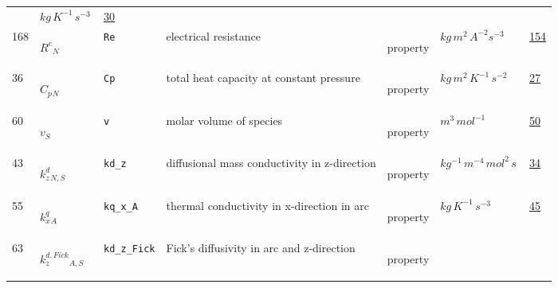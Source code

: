 \begin{longtable}{|p{1cm}|p{2.5cm}|p{4.5cm}|p{8cm}|p{3.0cm}|p{3cm}|p{1cm}|}
             & $ kg \,K^{-1} \,s^{-3} \, $
             &                 \hyperlink{"e:30"}{ 30 }
                 \\
            168
             & \hypertarget{"v:168"}{ $ {{R^e}}{_{N}} $}
             & \verb|Re|
             & electrical resistance
             & \begin{lay}property \end{lay}
             & $ kg \,m^{2} \,A^{-2} s^{-3} \, $
             &                 \hyperlink{"e:154"}{ 154 }
                 \\
            36
             & \hypertarget{"v:36"}{ $ {{C_p}}{_{N}} $}
             & \verb|Cp|
             & total heat capacity at constant pressure
             & \begin{lay}property \end{lay}
             & $ kg \,m^{2} \,K^{-1} \,s^{-2} \, $
             &                 \hyperlink{"e:27"}{ 27 }
                 \\
            60
             & \hypertarget{"v:60"}{ $ {v}{_{S}} $}
             & \verb|v|
             & molar volume of species
             & \begin{lay}property \end{lay}
             & $ m^{3} \,mol^{-1} \, $
             &                 \hyperlink{"e:50"}{ 50 }
                 \\
            43
             & \hypertarget{"v:43"}{ $ {{k^d_z}}{_{N, S}} $}
             & \verb|kd_z|
             & diffusional mass conductivity in z-direction
             & \begin{lay}property \end{lay}
             & $ kg^{-1} \,m^{-4} \,mol^{2} \,s \, $
             &                 \hyperlink{"e:34"}{ 34 }
                 \\
            55
             & \hypertarget{"v:55"}{ $ {{k^q_x}}{_{A}} $}
             & \verb|kq_x_A|
             & thermal conductivity in x-direction in arc
             & \begin{lay}property \end{lay}
             & $ kg \,K^{-1} \,s^{-3} \, $
             &                 \hyperlink{"e:45"}{ 45 }
                 \\
            63
             & \hypertarget{"v:63"}{ $ {{k^{d,Fick}_z}}{_{A, S}} $}
             & \verb|kd_z_Fick|
             & Fick's diffusivity in arc and z-direction 
             & \begin{lay}property \end{lay}

\end{longtable}
